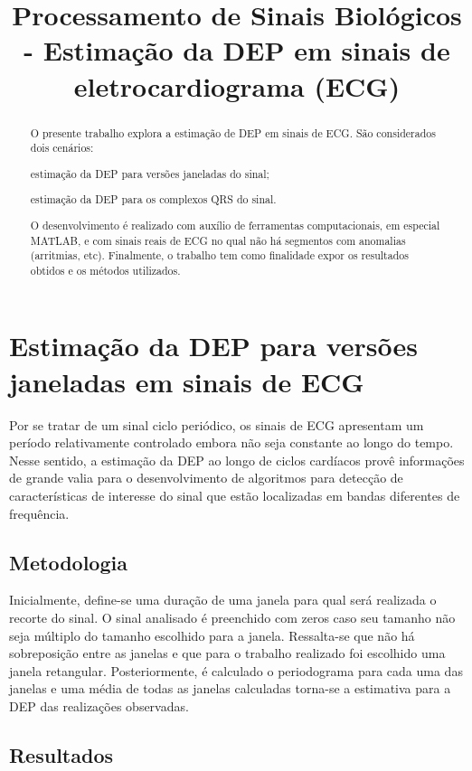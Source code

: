 \documentclass{article}
\title{Processamento de Sinais Biológicos - Estimação da DEP em sinais de eletrocardiograma (ECG)}
\begin{document}
\maketitle

\begin{abstract}
O presente trabalho explora a estimação de DEP em sinais de ECG. São considerados dois cenários:
\begin{enumerate*}[label=(\roman*)]
		\item estimação da DEP para versões janeladas do sinal;
		\item estimação da DEP para os complexos QRS do sinal.
\end{enumerate*}
O desenvolvimento é realizado com auxílio de ferramentas computacionais, em especial MATLAB, e com sinais reais de ECG no qual não há segmentos com anomalias (arritmias, etc). Finalmente, o trabalho tem como finalidade expor os resultados obtidos e os métodos utilizados.
\end{abstract}


\section{Estimação da DEP para versões janeladas em sinais de ECG}
Por se tratar de um sinal ciclo periódico, os sinais de ECG apresentam um período relativamente controlado embora não seja constante ao longo do tempo. Nesse sentido, a estimação da DEP ao longo de ciclos cardíacos provê informações de grande valia para o desenvolvimento de algoritmos para detecção de características de interesse do sinal que estão localizadas em bandas diferentes de frequência.

\subsection{Metodologia}
Inicialmente, define-se uma duração de uma janela para qual será realizada o recorte do sinal. O sinal analisado é preenchido com zeros caso seu tamanho não seja múltiplo do tamanho escolhido para a janela. Ressalta-se que não há sobreposição entre as janelas e que para o trabalho realizado foi escolhido uma janela retangular. Posteriormente, é calculado o periodograma para cada uma das janelas e uma média de todas as janelas calculadas torna-se a estimativa para a DEP das realizações observadas.

\subsection{Resultados}
\end{document}
